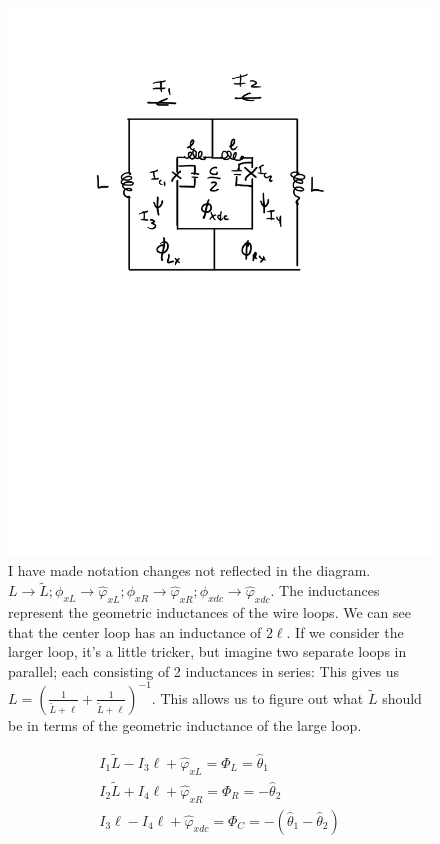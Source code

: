 \documentclass[paper=a4, twocolumn, fontsize=10pt]{article} %
\numberwithin{equation}{section} %
\numberwithin{figure}{section} %
\numberwithin{table}{section} %
\def \df#1{\hat{#1}}
\begin{document}
\begin{figure}[H]
\centering
\includegraphics[scale=.5]{circuit_diagram.pdf}
\caption{I have made notation changes not reflected in the diagram. $L \to \tilde{L}; \phi_{xL} \to \df\varphi_{xL}; \phi_{xR} \to \df\varphi_{xR};  \phi_{xdc} \to \df\varphi_{xdc}$. The inductances represent the geometric inductances of the wire loops. We can see that the center loop has an inductance of $2\ell$. If we consider the larger loop, it's a little tricker, but imagine two separate loops in parallel; each consisting of 2 inductances in series: This gives us $L = ( \frac{1}{\tilde{L}+\ell} +  \frac{1}{\tilde{L}+\ell} )^{-1} $. This allows us to figure out what $\tilde{L}$ should be in terms of the geometric inductance of the large loop.
}
\end{figure}

\begin{align}
    I_1 \tilde{L} - I_3 \ell + \df\varphi_{xL} = \Phi_{L} = \df\theta_1
    \\
    I_2 \tilde{L} + I_4 \ell + \df\varphi_{xR} = \Phi_{R} = -\df\theta_2
    \\
    I_3 \ell - I_4 \ell + \df\varphi_{xdc} = \Phi_{C} = -(\df\theta_1 - \df\theta_2)
\end{align} 
\end{document}
